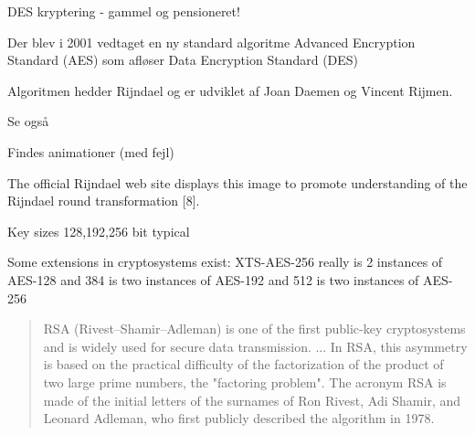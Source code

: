\documentclass[Screen16to9,17pt]{foils}
\begin{document}


\begin{list1}
\item DES kryptering - gammel og pensioneret!
\item Der blev i 2001 vedtaget en ny standard algoritme Advanced Encryption
  Standard (AES) som afløser Data Encryption Standard (DES)
\item Algoritmen hedder Rijndael og er udviklet
af Joan Daemen og Vincent Rijmen.
\item Se også 
\item Findes animationer (med fejl) 
\end{list1}



\begin{list2}
\item The official Rijndael web site displays this image to promote understanding of the Rijndael round transformation [8].
\item Key sizes 128,192,256 bit typical
\item Some extensions in cryptosystems exist: XTS-AES-256 really is 2 instances of AES-128 and 384 is two instances of AES-192 and 512 is two instances of AES-256
\item {}
\end{list2}



\begin{quote}
RSA (Rivest–Shamir–Adleman) is one of the first public-key cryptosystems and is widely used for secure data transmission. ...
In RSA, this asymmetry is based on the practical difficulty of the factorization of the product of two large prime numbers, the "factoring problem". The acronym RSA is made of the initial letters of the surnames of Ron Rivest, Adi Shamir, and Leonard Adleman, who first publicly described the algorithm in 1978.
\end{quote}
\end{document}
